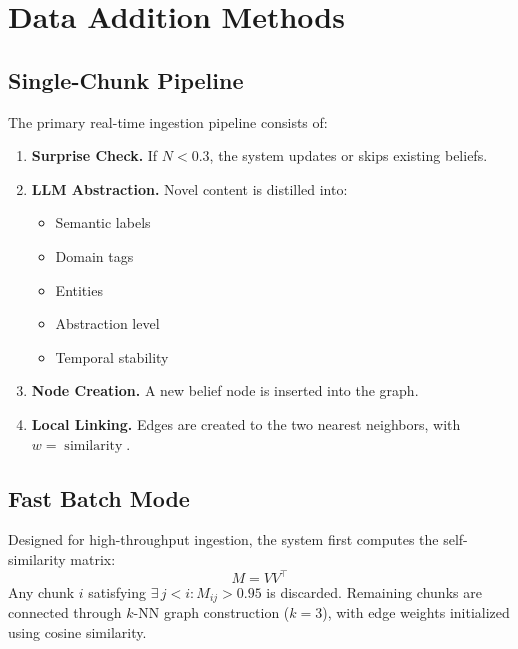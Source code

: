 \documentclass[11pt,a4paper]{article}
\begin{document}
\section{Data Addition Methods}

\subsection{Single-Chunk Pipeline}

The primary real-time ingestion pipeline consists of:

\begin{enumerate}
    \item \textbf{Surprise Check.}
          If $N < 0.3$, the system updates or skips existing beliefs.

    \item \textbf{LLM Abstraction.}
          Novel content is distilled into:
          \begin{itemize}
              \item Semantic labels
              \item Domain tags
              \item Entities
              \item Abstraction level
              \item Temporal stability
          \end{itemize}

    \item \textbf{Node Creation.}
          A new belief node is inserted into the graph.

    \item \textbf{Local Linking.}
          Edges are created to the two nearest neighbors, with
          $w = \operatorname{similarity}$.
\end{enumerate}

\subsection{Fast Batch Mode}

Designed for high-throughput ingestion, the system first computes the
self-similarity matrix:
\[
    M = V V^{\top}
\]
Any chunk $i$ satisfying $\exists\, j < i : M_{ij} > 0.95$ is discarded. Remaining
chunks are connected through $k$-NN graph construction ($k = 3$), with edge weights
initialized using cosine similarity.
\end{document}
